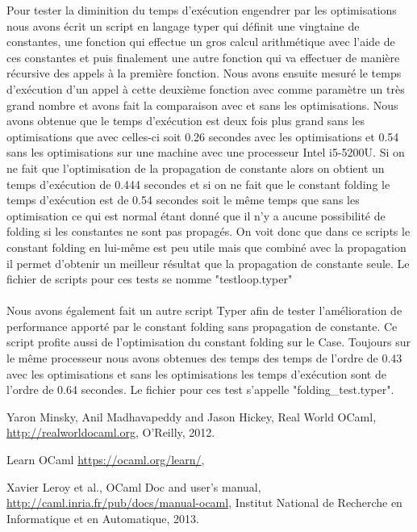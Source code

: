 \documentclass{article}
\begin{document}
Pour tester la diminition du temps d'exécution engendrer par les optimisations
nous avons écrit un script en langage typer qui définit une vingtaine de
constantes, une fonction qui effectue un gros calcul arithmétique avec l'aide
de ces constantes et puis finalement une autre fonction qui va effectuer de
manière récursive des appels à la première fonction. Nous avons ensuite 
mesuré le temps d'exécution d'un appel à cette deuxième fonction avec comme
paramètre un très grand nombre et avons fait la comparaison avec et sans les
optimisations. Nous avons obtenue que le temps d'exécution est deux fois plus
grand sans les optimisations que avec celles-ci soit 0.26 secondes avec les 
optimisations et 0.54 sans les optimisations sur une machine avec une
processeur Intel i5-5200U. Si on ne fait que l'optimisation de la propagation
de constante alors on obtient un temps d'exécution de 0.444 secondes et si
on ne fait que le constant folding le temps d'exécution est de 0.54 secondes 
soit le même temps que sans les optimisation ce qui est normal étant donné que
il n'y a aucune possibilité de folding si les constantes ne sont pas propagés.
On voit donc que dans ce scripts le constant folding en lui-même est peu utile
mais que combiné avec la propagation il permet d'obtenir un meilleur résultat
que la propagation de constante seule. Le fichier de scripts pour ces tests
se nomme "testloop.typer"

\paragraph{}
Nous avons également fait un autre script Typer afin de tester l'amélioration
de performance apporté par le constant folding sans propagation de constante.
Ce script profite aussi de l'optimisation du constant folding sur le Case.
Toujours sur le même processeur nous avons obtenues des temps des temps de
l'ordre de 0.43 avec les optimisations et sans les optimisations les temps
d'exécution sont de l'ordre de 0.64 secondes. Le fichier pour ces test 
s'appelle "folding\_test.typer".


\begin{thebibliography}{9}

	Yaron Minsky, Anil Madhavapeddy and Jason Hickey,
	Real World OCaml,
	\url{http://realworldocaml.org},
	O'Reilly,
	2012.

	Learn OCaml
	\url{https://ocaml.org/learn/},

	Xavier Leroy et al.,
	OCaml Doc and user's manual,
	\url{http://caml.inria.fr/pub/docs/manual-ocaml},
	Institut National de Recherche en Informatique et en Automatique,
	2013.

\end{thebibliography}
\end{document}

